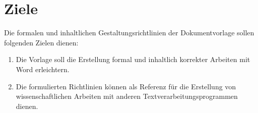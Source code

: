 \section{Ziele}\label{Ziele}

Die formalen und inhaltlichen Gestaltungsrichtlinien der Dokumentvorlage sollen folgenden Zielen dienen:

\begin{enumerate}
    \item{Die Vorlage soll die Erstellung formal und inhaltlich korrekter Arbeiten mit Word erleichtern.}
    \item{Die formulierten Richtlinien können als Referenz für die Erstellung von wissenschaftlichen Arbeiten mit anderen Textverarbeitungsprogrammen dienen.}
\end{enumerate}
